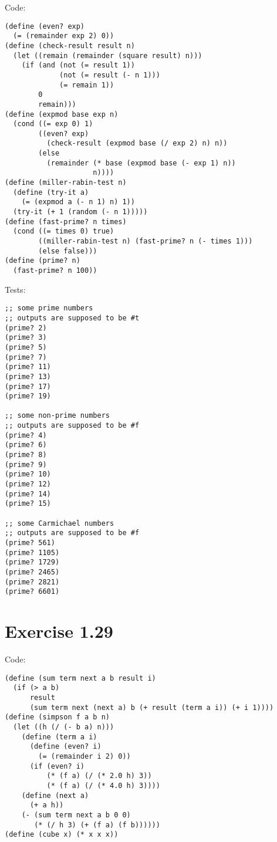 \documentclass[../main.tex]{subfiles}
\begin{document}
Code:

\begin{lstlisting}
(define (even? exp)
  (= (remainder exp 2) 0))
(define (check-result result n)
  (let ((remain (remainder (square result) n)))
    (if (and (not (= result 1))
             (not (= result (- n 1)))
             (= remain 1))
        0
        remain)))
(define (expmod base exp n)
  (cond ((= exp 0) 1)
        ((even? exp)
          (check-result (expmod base (/ exp 2) n) n))
        (else
          (remainder (* base (expmod base (- exp 1) n))
                     n))))
(define (miller-rabin-test n)
  (define (try-it a)
    (= (expmod a (- n 1) n) 1))
  (try-it (+ 1 (random (- n 1)))))
(define (fast-prime? n times)
  (cond ((= times 0) true)
        ((miller-rabin-test n) (fast-prime? n (- times 1)))
        (else false)))
(define (prime? n)
  (fast-prime? n 100))
\end{lstlisting}

Tests:

\begin{lstlisting}
;; some prime numbers
;; outputs are supposed to be #t
(prime? 2)
(prime? 3)
(prime? 5)
(prime? 7)
(prime? 11)
(prime? 13)
(prime? 17)
(prime? 19)

;; some non-prime numbers
;; outputs are supposed to be #f
(prime? 4)
(prime? 6)
(prime? 8)
(prime? 9)
(prime? 10)
(prime? 12)
(prime? 14)
(prime? 15)

;; some Carmichael numbers
;; outputs are supposed to be #f
(prime? 561)
(prime? 1105)
(prime? 1729)
(prime? 2465)
(prime? 2821)
(prime? 6601)
\end{lstlisting}

\section{Exercise 1.29}

Code:

\begin{lstlisting}
(define (sum term next a b result i)
  (if (> a b)
      result
      (sum term next (next a) b (+ result (term a i)) (+ i 1))))
(define (simpson f a b n)
  (let ((h (/ (- b a) n)))
    (define (term a i)
      (define (even? i)
        (= (remainder i 2) 0))
      (if (even? i)
          (* (f a) (/ (* 2.0 h) 3))
          (* (f a) (/ (* 4.0 h) 3))))
    (define (next a)
      (+ a h))
    (- (sum term next a b 0 0)
       (* (/ h 3) (+ (f a) (f b))))))
(define (cube x) (* x x x))
\end{lstlisting}
\end{document}
